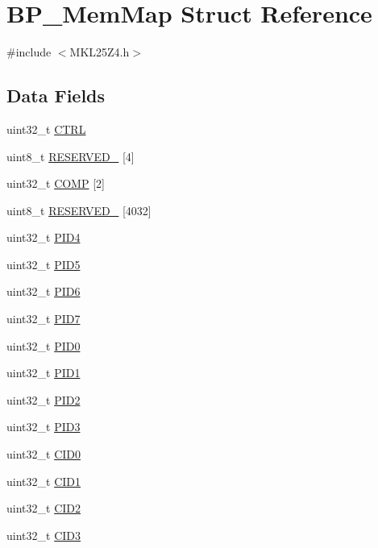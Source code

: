 \hypertarget{struct_b_p___mem_map}{}\section{B\+P\+\_\+\+Mem\+Map Struct Reference}
\label{struct_b_p___mem_map}


{\ttfamily \#include $<$M\+K\+L25\+Z4.\+h$>$}

\subsection*{Data Fields}
\begin{DoxyCompactItemize}
\item 
uint32\+\_\+t \hyperlink{struct_b_p___mem_map_adc78a44bcbb6564277efefa8f07439ce}{C\+T\+RL}
\item 
uint8\+\_\+t \hyperlink{struct_b_p___mem_map_aeec0c0802a6643ff1423787e429c4b77}{R\+E\+S\+E\+R\+V\+E\+D\+\_} \mbox{[}4\mbox{]}
\item 
uint32\+\_\+t \hyperlink{struct_b_p___mem_map_ac8c266a109ad2f29683dfb7873b71974}{C\+O\+MP} \mbox{[}2\mbox{]}
\item 
uint8\+\_\+t \hyperlink{struct_b_p___mem_map_a72d853a7f23eb2aa5e1c285f1f022449}{R\+E\+S\+E\+R\+V\+E\+D\+\_} \mbox{[}4032\mbox{]}
\item 
uint32\+\_\+t \hyperlink{struct_b_p___mem_map_a1e7c67c7222aedc5a3c16c5560748793}{P\+I\+D4}
\item 
uint32\+\_\+t \hyperlink{struct_b_p___mem_map_abb77e60e581e55fe33af44ebf1030116}{P\+I\+D5}
\item 
uint32\+\_\+t \hyperlink{struct_b_p___mem_map_a9f611c760b2dc672f72485a6751ae703}{P\+I\+D6}
\item 
uint32\+\_\+t \hyperlink{struct_b_p___mem_map_a60dff3ca8ab0f81ef166fffd7fbc3356}{P\+I\+D7}
\item 
uint32\+\_\+t \hyperlink{struct_b_p___mem_map_acb1de7fb15f421c81ddfbf6feba0c4f2}{P\+I\+D0}
\item 
uint32\+\_\+t \hyperlink{struct_b_p___mem_map_a2b27e33fff1d3730366050ede44cb7c3}{P\+I\+D1}
\item 
uint32\+\_\+t \hyperlink{struct_b_p___mem_map_a76e6da948034b317948bbe7b794b02c6}{P\+I\+D2}
\item 
uint32\+\_\+t \hyperlink{struct_b_p___mem_map_a556f1775a26cc79e8ab97c8452ce2c41}{P\+I\+D3}
\item 
uint32\+\_\+t \hyperlink{struct_b_p___mem_map_a533b8c0657ac258f340baaea96ecc00c}{C\+I\+D0}
\item 
uint32\+\_\+t \hyperlink{struct_b_p___mem_map_aecbf01d7c8fd4689e6ede5b9c12b3d94}{C\+I\+D1}
\item 
uint32\+\_\+t \hyperlink{struct_b_p___mem_map_a3900abf0b057f791c7fe66a79862f837}{C\+I\+D2}
\item 
uint32\+\_\+t \hyperlink{struct_b_p___mem_map_a26076f956d1700acaeb0c9db60846606}{C\+I\+D3}
\end{DoxyCompactItemize}


